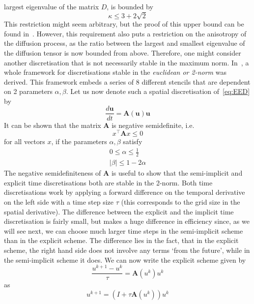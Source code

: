 largest eigenvalue of the matrix $D$, is bounded by 
\begin{equation}
    \kappa \leq 3 + 2\sqrt{2}
\end{equation}
This restriction might seem arbitrary, but the proof of this upper bound can be found
in~\cite{weickert96}.
However, this requirement also puts a restriction on the anisotropy of the diffusion process, as the
ratio between the largest and smallest eigenvalue of the diffusion tensor is now bounded from above.
Therefore, one might consider another discretisation that is not necessarily stable in
the maximum norm.\newpage\noindent
In~\cite{www13}, a whole framework for discretisations stable in the
\textit{euclidean or 2-norm} was derived. This framework embeds a series of 8 different
stencils that are dependent on 2 parameters $\alpha, \beta$. Let us now denote such a spatial
discretisation of~\eqref{eq:EED} by 
\begin{equation}
    \frac{d\mathbf{u}}{dt} = \mathbf{A}(\mathbf{u})\mathbf{u}
\end{equation}
It can be shown that the matrix $\mathbf{A}$ is negative semidefinite, i.e.\  
\begin{equation*}
    x^\top \mathbf{A}x \leq 0
\end{equation*}
for all vectors $x$, if the parameters $\alpha,\beta$ satisfy
\begin{eqnarray}
    0 \leq \alpha \leq \frac{1}{2}\\
    \vert\beta\vert \leq 1-2\alpha
\end{eqnarray}
The negative semidefiniteness of $\mathbf{A}$ is useful to show that the semi-implicit and
explicit time discretisations both are stable in the 2-norm.
Both time discretisations work by applying a forward difference on
the temporal derivative on the left side with a time step size $\tau$ (this corresponds to the grid
size in the spatial derivative). 
The difference between the explicit and the implicit time discretisation is fairly small, but makes
a huge difference in efficiency since, as we will see next, we can choose much larger time steps in
the semi-implicit scheme than in the explicit scheme. 
The difference lies in the fact, that in the explicit scheme, the right hand side does not involve any terms
`from the future', while in the semi-implicit scheme it does.
We can now write the explicit scheme given by
\begin{equation}
    \frac{u^{k+1} - u^{k}}{\tau} = \mathbf{A}(u^k)u^k
\end{equation}
as
\begin{equation}
    u^{k+1} = (I + \tau\mathbf{A}(u^k))u^k
\end{equation}
